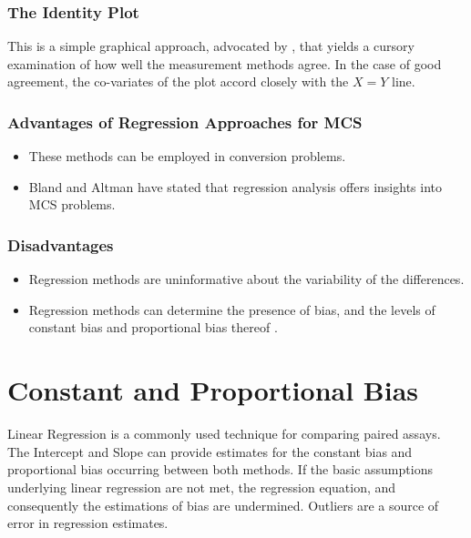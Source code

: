 \documentclass[12pt, a4paper]{report}
\theoremstyle{plain}
\theoremstyle{definition}
\theoremstyle{remark}
\begin{document}
\subsubsection{The Identity Plot} This is a simple graphical approach, advocated by \citet{BA86}, that yields a cursory examination of how well the measurement methods agree. In the case of good agreement, the co-variates of the plot accord closely with the $X=Y$ line.

\subsubsection{Advantages of Regression Approaches for MCS}
\begin{itemize}
	\item These methods can be employed in conversion problems.
	\item Bland and Altman have stated that regression analysis offers insights into MCS problems.
\end{itemize}
\subsubsection{Disadvantages}
\begin{itemize}
	\item Regression methods are uninformative about the variability of the differences.
\end{itemize}

\begin{itemize}\item
	Regression methods can determine the presence of bias, and the levels of constant bias and proportional bias thereof \cite{ludbrook97,ludbrook02}.
\end{itemize}


\section{Constant and Proportional Bias}

Linear Regression is a commonly used technique for comparing paired assays. The Intercept and Slope can provide estimates for the constant bias and proportional bias occurring between both methods. If the basic assumptions underlying linear regression are not met, the regression equation, and consequently the estimations
of bias are undermined. Outliers are a source of error in regression estimates.
\end{document}
